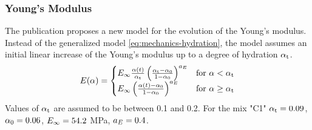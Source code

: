 \subsubsection{Young's Modulus}
The publication proposes a new model for the evolution of the Young's modulus.
Instead of the generalized model \eqref{eq:mechanics-hydration}, the model assumes an initial linear increase of the Young's modulus up to a degree of hydration $\alpha_{\text{t}}$.
\begin{align}
	E(\alpha) = 
	\begin{cases}
		E_\infty  \frac{\alpha(t)}{\alpha_{\text{t}}}\left( \frac{\alpha_{\text{t}}-\alpha_{0}}{1-\alpha_{0}}\right)^{a_{E}}   
		& \text{for $\alpha < \alpha_{\text{t}}$}\\
		E_\infty  \left( \frac{\alpha(t)-\alpha_{0}}{1-\alpha_{0}}\right)^{a_{E}}  
		& \text{for $\alpha \ge \alpha_{\text{t}}$}
	\end{cases}
\end{align}
Values of $\alpha_{\text{t}}$ are assumed to be between 0.1 and 0.2.
For the mix "C1" $\alpha_{\text{t}} = 0.09$, $\alpha_{0} = 0.06$, $E_\infty = 54.2$ MPa, $a_{E} = 0.4$.
